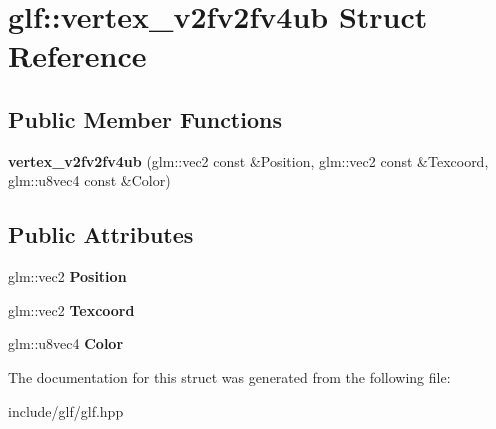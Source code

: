 \hypertarget{structglf_1_1vertex__v2fv2fv4ub}{\section{glf\-:\-:vertex\-\_\-v2fv2fv4ub \-Struct \-Reference}
\label{structglf_1_1vertex__v2fv2fv4ub}
}
\subsection*{\-Public \-Member \-Functions}
\begin{DoxyCompactItemize}
\item 
\hypertarget{structglf_1_1vertex__v2fv2fv4ub_a9b10ff9f075fe3581bb4d0328399c2e3}{{\bfseries vertex\-\_\-v2fv2fv4ub} (glm\-::vec2 const \&\-Position, glm\-::vec2 const \&\-Texcoord, glm\-::u8vec4 const \&\-Color)}\label{structglf_1_1vertex__v2fv2fv4ub_a9b10ff9f075fe3581bb4d0328399c2e3}

\end{DoxyCompactItemize}
\subsection*{\-Public \-Attributes}
\begin{DoxyCompactItemize}
\item 
\hypertarget{structglf_1_1vertex__v2fv2fv4ub_a759c12f1fd63b8be59605bc8716b68b5}{glm\-::vec2 {\bfseries \-Position}}\label{structglf_1_1vertex__v2fv2fv4ub_a759c12f1fd63b8be59605bc8716b68b5}

\item 
\hypertarget{structglf_1_1vertex__v2fv2fv4ub_a0cf853ea64e97c2e6d9307bba772a19a}{glm\-::vec2 {\bfseries \-Texcoord}}\label{structglf_1_1vertex__v2fv2fv4ub_a0cf853ea64e97c2e6d9307bba772a19a}

\item 
\hypertarget{structglf_1_1vertex__v2fv2fv4ub_a99e7356f4dad39c09ee3b3e4e95cdb32}{glm\-::u8vec4 {\bfseries \-Color}}\label{structglf_1_1vertex__v2fv2fv4ub_a99e7356f4dad39c09ee3b3e4e95cdb32}

\end{DoxyCompactItemize}


\-The documentation for this struct was generated from the following file\-:\begin{DoxyCompactItemize}
\item 
include/glf/glf.\-hpp\end{DoxyCompactItemize}
